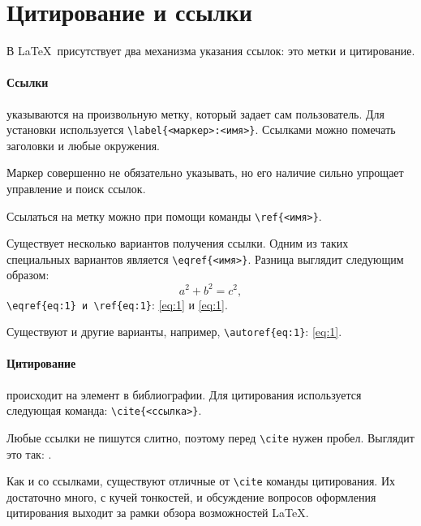 
\section{Цитирование и ссылки}
В \LaTeX~присутствует два механизма указания ссылок: это метки и цитирование. 

\paragraph{Ссылки} указываются на произвольную метку, который задает сам пользователь. Для установки используется \verb+\label{<маркер>:<имя>}+. Ссылками можно помечать заголовки и любые окружения. 

Маркер совершенно не обязательно указывать, но его наличие сильно упрощает управление и поиск ссылок. 

Ссылаться на метку можно при помощи команды \verb+\ref{<имя>}+.

Существует несколько вариантов получения ссылки. Одним из таких специальных вариантов является \verb+\eqref{<имя>}+. Разница выглядит следующим образом:
\begin{equation}\label{eq:1}
    a^2+b^2=c^2, 
\end{equation}
\verb+\eqref{eq:1} и \ref{eq:1}+: \eqref{eq:1} и \ref{eq:1}.

Существуют и другие варианты, например, \verb+\autoref{eq:1}+: \autoref{eq:1}.

\paragraph{Цитирование} происходит на элемент в библиографии. Для цитирования используется следующая команда: \verb+\cite{<ссылка>}+. 

Любые ссылки не пишутся слитно, поэтому перед \verb+\cite+ нужен пробел. Выглядит это так: \cite{test}.

Как и со ссылками, существуют отличные от \verb+\cite+ команды цитирования. Их достаточно много, с кучей тонкостей, и обсуждение вопросов оформления цитирования выходит за рамки обзора возможностей \LaTeX.


